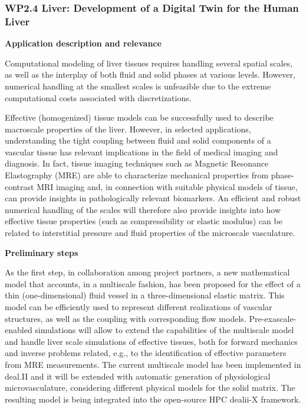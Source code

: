 \documentclass[a4paper,12pt, numbers]{article}
\begin{document}
\subsubsection*{WP2.4 Liver: Development of a Digital Twin for the Human Liver}

\noindent\textbf{Application description and relevance}

Computational modeling of liver tissues requires handling several spatial scales, as well as the interplay of both fluid and solid phases at various levels.
However, numerical handling at the smallest scales is unfeasible due to the extreme computational costs associated with discretizations.

Effective (homogenized) tissue models can be successfully used to describe macroscale properties of the liver.
However, in selected applications, understanding the tight coupling between fluid and solid components of a vascular tissue has relevant implications in the field of medical imaging and diagnosis.
In fact, tissue imaging techniques such as Magnetic Resonance Elastography (MRE) are able to characterize mechanical properties from phase-contrast MRI imaging and, in connection with suitable physical models of tissue, can provide insights in pathologically relevant biomarkers.
An efficient and robust numerical handling of the scales will therefore also provide insights into how effective tissue properties (such as compressibility or elastic modulus) can be related to interstitial pressure and fluid properties of the microscale vasculature.

\noindent\textbf{Preliminary steps}

As the first step, in collaboration among project partners, a new mathematical model that accounts, in a multiscale fashion, has been proposed for the effect of a thin (one-dimensional) fluid vessel in a three-dimensional elastic matrix.
This model can be efficiently used to represent different realizations of vascular structures, as well as the coupling with corresponding flow models.
Pre-exascale-enabled simulations will allow to extend the capabilities of the multiscale model and handle liver scale simulations of effective tissues, both for forward mechanics and inverse problems related, e.g., to the identification of effective parameters from MRE measurements.
The current multiscale model has been implemented in deal.II and it will be extended with automatic generation of physiological microvasculature, considering different physical models for the solid matrix.
The resulting model is being integrated into the open-source HPC dealii-X framework.
\end{document}
